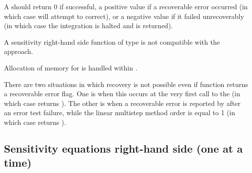 {
  A  should return 0 if successful, a positive value if a recoverable
  error occurred (in which case {\cvodes} will attempt to correct), or a negative 
  value if it failed unrecoverably (in which case the integration is halted and
   is returned).
}
{
  {\warn}A sensitivity right-hand side function of type  is not
  compatible with the  approach.

  Allocation of memory for  is handled within {\cvodes}.

  There are two situations in which recovery is not possible even if 
  function returns a recoverable error flag.  One is when this
  occurs at the very first call to the  (in which case {\cvodes} returns
  ).  The other is when a recoverable error is reported
  by  after an error test failure, while the linear multistep method
  order is equal to 1 (in which case {\cvodes} returns ).
}

\subsection{Sensitivity equations right-hand side (one at a time)}
  
